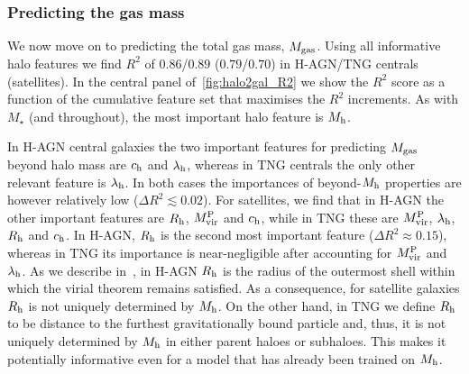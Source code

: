 \documentclass[usenatbib,useAMS]{mnras}
\begin{document}

\subsubsection{Predicting the gas mass} \label{sec:mgas_pred}


We now move on to predicting the total gas mass, $M_{\rm gas}$. Using all informative halo features we find $R^2$ of $0.86$/$0.89$ ($0.79$/$0.70$) in H-AGN/TNG centrals (satellites). In the central panel of~\cref{fig:halo2gal_R2} we show the $R^2$ score as a function of the cumulative feature set that maximises the $R^2$ increments. As with $M_\star$ (and throughout), the most important halo feature is $M_{\rm h}$.

In H-AGN central galaxies the two important features for predicting $M_{\rm gas}$ beyond halo mass are $c_{\rm h}$ and $\lambda_{\rm h}$, whereas in TNG centrals the only other relevant feature is $\lambda_{\rm h}$. In both cases the importances of beyond-$M_{\rm h}$ properties are however relatively low ($\Delta R^2 \lesssim 0.02$). For satellites, we find that in H-AGN the other important features are $R_{\rm h}$, $M_{\rm vir}^{\rm P}$ and $c_{\rm h}$, while in TNG these are $M_{\rm vir}^{\rm P}$, $\lambda_{\rm h}$, $R_{\rm h}$ and $c_{\rm h}$. In H-AGN, $R_{\rm h}$ is the second most important feature ($\Delta R^2 \approx 0.15$), whereas in TNG its importance is near-negligible after accounting for $M_{\rm vir}^{\rm P}$ and $\lambda_{\rm h}$. As we describe in~, in H-AGN $R_{\rm h}$ is the radius of the outermost shell within which the virial theorem remains satisfied. As a consequence, for satellite galaxies $R_{\rm h}$ is not uniquely determined by $M_{\rm h}$. On the other hand, in TNG we define $R_{\rm h}$ to be distance to the furthest gravitationally bound particle and, thus, it is not uniquely determined by $M_{\rm h}$ in either parent haloes or subhaloes. This makes it potentially informative even for a model that has already been trained on $M_{\rm h}$.
\end{document}
